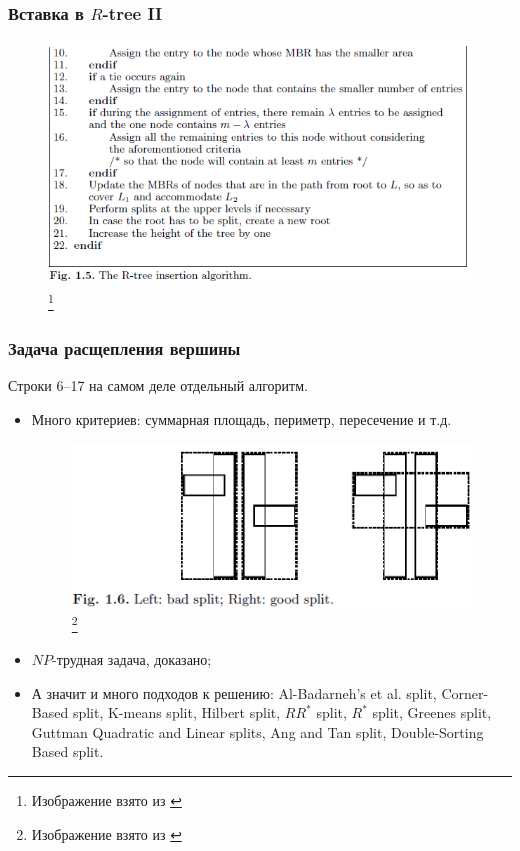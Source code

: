 \documentclass{beamer}
\begin{document}
\begin{frame}
\frametitle{Вставка в $R$-tree II}

\begin{figure}[htb]
\includegraphics[width=\textwidth,height=0.8\textheight,keepaspectratio]{insert4.png} 
\footnote{\tiny{Изображение взято из \cite{Manolopoulos2005}}}
\end{figure}   

\end{frame}

\begin{frame}
\frametitle{Задача расщепления вершины}

Строки 6--17 на самом деле отдельный алгоритм.

\begin{itemize}
  \setlength\itemsep{1em}
  \item Много критериев: суммарная площадь, периметр, пересечение и т.д.
  \begin{figure}[htb]
  \includegraphics[width=\textwidth,height=0.2\textheight,keepaspectratio]{delete.png} 
  \footnote{\tiny{Изображение взято из \cite{Manolopoulos2005}}}
  \end{figure}   
  \item $NP$-трудная задача, доказано;
  \item А значит и много подходов к решению: Al-Badarneh's et al. split, Corner-Based split, K-means split, Hilbert split, $RR^*$ split, $R^*$ split, Greenes split, Guttman Quadratic and Linear splits, Ang and Tan split, Double-Sorting Based split.
\end{itemize}

\end{frame}
\end{document}
